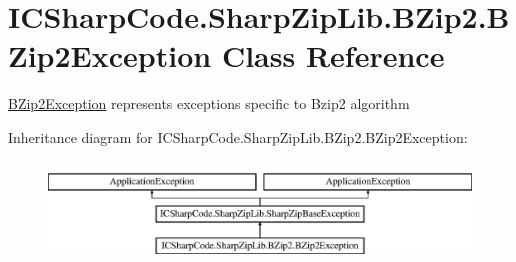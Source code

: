 \hypertarget{class_i_c_sharp_code_1_1_sharp_zip_lib_1_1_b_zip2_1_1_b_zip2_exception}{}\section{I\+C\+Sharp\+Code.\+Sharp\+Zip\+Lib.\+B\+Zip2.\+B\+Zip2\+Exception Class Reference}
\label{class_i_c_sharp_code_1_1_sharp_zip_lib_1_1_b_zip2_1_1_b_zip2_exception}


\hyperlink{class_i_c_sharp_code_1_1_sharp_zip_lib_1_1_b_zip2_1_1_b_zip2_exception}{B\+Zip2\+Exception} represents exceptions specific to Bzip2 algorithm  


Inheritance diagram for I\+C\+Sharp\+Code.\+Sharp\+Zip\+Lib.\+B\+Zip2.\+B\+Zip2\+Exception\+:\begin{figure}[H]
\begin{center}
\leavevmode
\includegraphics[height=2.709677cm]{class_i_c_sharp_code_1_1_sharp_zip_lib_1_1_b_zip2_1_1_b_zip2_exception}
\end{center}
\end{figure}
